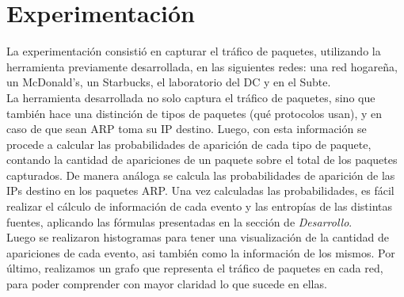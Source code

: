 \section{Experimentación}
La experimentación consistió en capturar el tráfico de paquetes, utilizando la herramienta previamente desarrollada, en las siguientes redes: una red hogareña, un McDonald's, un Starbucks, el laboratorio del DC y en el Subte.\\

La herramienta desarrollada no solo captura el tráfico de paquetes, sino que también hace una distinción de tipos de paquetes (qué protocolos usan), y en caso de que sean ARP toma su IP destino. Luego, con esta información se procede a calcular las probabilidades de aparición de cada tipo de paquete, contando la cantidad de apariciones de un paquete sobre el total de los paquetes capturados. De manera análoga se calcula las probabilidades de aparición de las IPs destino en los paquetes ARP. Una vez calculadas las probabilidades, es fácil realizar el cálculo de información de cada evento y las entropías de las distintas fuentes, aplicando las fórmulas presentadas en la sección de \textit{Desarrollo}.\\

Luego se realizaron histogramas para tener una visualización de la cantidad de apariciones de cada evento, asi también como la información de los mismos.
Por último, realizamos un grafo que representa el tráfico de paquetes en cada red, para poder comprender con mayor claridad lo que sucede en ellas.

\newpage


\newpage


\newpage


\newpage


\newpage


\newpage


